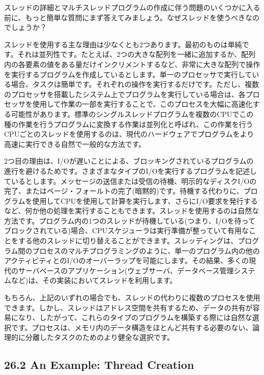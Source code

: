 スレッドの詳細とマルチスレッドプログラムの作成に伴う問題のいくつかに入る前に、もっと簡単な質問にまず答えてみましょう。なぜスレッドを使うべきなのでしょうか？

スレッドを使用する主な理由は少なくとも2つあります。最初のものは単純です。それは並列性です。たとえば、2つの大きな配列を一緒に追加するか、配列内の各要素の値をある量だけインクリメントするなど、非常に大きな配列で操作を実行するプログラムを作成しているとします。単一のプロセッサで実行している場合、タスクは簡単です。それぞれの操作を実行するだけです。ただし、複数のプロセッサを搭載したシステム上でプログラムを実行している場合は、各プロセッサを使用して作業の一部を実行することで、このプロセスを大幅に高速化する可能性があります。標準のシングルスレッドプログラムを複数のCPUでこの種の作業を行うプログラムに変換する作業は並列化と呼ばれ、この作業を行うCPUごとのスレッドを使用するのは、現代のハードウェアでプログラムをより高速に実行できる自然で一般的な方法です。

2つ目の理由は、I/Oが遅いことによる、ブロッキングされているプログラムの進行を避けるためです。さまざまなタイプのI/Oを実行するプログラムを記述しているとします。メッセージの送信または受信の待機、明示的なディスクI/Oの完了、またはページ・フォールトの完了(暗黙的)です。待機する代わりに、プログラムを使用してCPUを使用して計算を実行します、さらにI/O要求を発行するなど、何か他の処理を実行することもできます。スレッドを使用するのは自然な方法です。プログラム内の1つのスレッドが待機している(つまり、I/Oを待ってブロックされている)場合、CPUスケジューラは実行準備が整っていて有用なことをする他のスレッドに切り替えることができます。スレッディングは、プログラム間のプロセスのマルチプログラミングのように、単一のプログラム内の他のアクティビティとのI/Oのオーバーラップを可能にします。その結果、多くの現代のサーバベースのアプリケーション(ウェブサーバ、データベース管理システムなど)は、その実装においてスレッドを利用します。

もちろん、上記のいずれの場合でも、スレッドの代わりに複数のプロセスを使用できます。しかし、スレッドはアドレス空間を共有するため、データの共有が容易になり、したがって、これらのタイプのプログラムを構築する際には自然な選択です。プロセスは、メモリ内のデータ構造をほとんど共有する必要のない、論理的に分離したタスクのためのより健全な選択です。

\hypertarget{an-example-thread-creation}{%
\subsection*{26.2 An Example: Thread
Creation}\label{an-example-thread-creation}}

